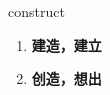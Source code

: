 
\begin{frame}
{\huge construct}
\begin{center}
\begin{enumerate}\Large
  \item \textbf{建造，建立}
  \item \textbf{创造，想出}
\end{enumerate}
\end{center}
\end{frame}
